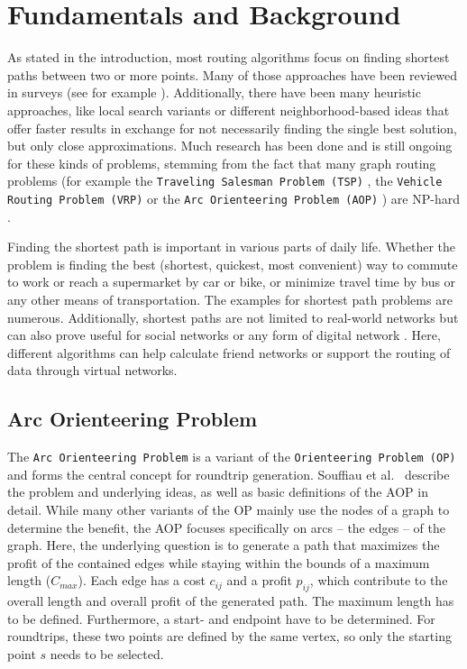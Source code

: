 \chapter{Fundamentals and Background}
\label{chapter:fundamentals}

As stated in the introduction, most routing algorithms focus on finding shortest paths between two or more points.
Many of those approaches have been reviewed in surveys (see for example \cite{wayahdi_greedy_2021}).
Additionally, there have been many heuristic approaches, like local search variants \cite{braysy_vehicle_2005, irnich_sequential_2006, ropke_heuristic_2005} or different neighborhood-based ideas \cite{braysy_vehicle_2005, irnich_sequential_2006, ropke_heuristic_2005} that offer faster results in exchange for not necessarily finding the single best solution, but only close approximations.
Much research has been done and is still ongoing for these kinds of problems, stemming from the fact that many graph routing problems (for example the \texttt{Traveling Salesman Problem (TSP)} \cite{gendreau_handbook_2010}, the \texttt{Vehicle Routing Problem (VRP)}  \cite{braysy_vehicle_2005, irnich_sequential_2006} or the \texttt{Arc Orienteering Problem (AOP)} \cite{agarwal_correlated_2023, buchin_tour4me_2022}) are NP-hard \cite{reinelt_traveling_2003}.
 
Finding the shortest path is important in various parts of daily life.
Whether the problem is finding the best (shortest, quickest, most convenient) way to commute to work or reach a supermarket by car or bike, or minimize travel time by bus or any other means of transportation.
The examples for shortest path problems are numerous.
Additionally, shortest paths are not limited to real-world networks but can also prove useful for social networks or any form of digital network \cite{potamias_fast_2009}.
Here, different algorithms can help calculate friend networks or support the routing of data through virtual networks. 

\section{Arc Orienteering Problem}
\label{sec:aop}

The \texttt{Arc Orienteering Problem} is a variant of the \texttt{Orienteering Problem (OP)} and forms the central concept for roundtrip generation.
Souffiau et al.\ \cite{souffriau_planning_2011} describe the problem and underlying ideas, as well as basic definitions of the AOP in detail.
While many other variants of the OP mainly use the nodes of a graph to determine the benefit, the AOP focuses specifically on arcs -- the edges -- of the graph.
Here, the underlying question is to generate a path that maximizes the profit of the contained edges while staying within the bounds of a maximum length ($C_{max}$). 
Each edge has a cost $c_{ij}$ and a profit $p_{ij}$, which contribute to the overall length and overall profit of the generated path.
The maximum length has to be defined.
Furthermore, a start- and endpoint have to be determined.
For roundtrips, these two points are defined by the same vertex, so only the starting point $s$ needs to be selected.

